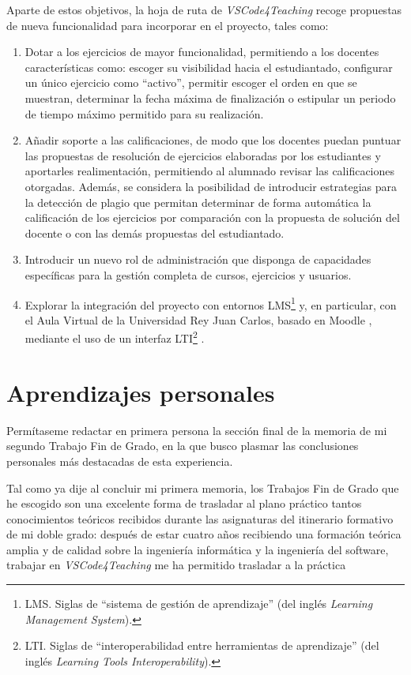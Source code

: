 Aparte de estos objetivos, la hoja de ruta de \textit{VSCode4Teaching} recoge propuestas de nueva funcionalidad para incorporar en el proyecto, tales como:
\begin{enumerate}
    \item Dotar a los ejercicios de mayor funcionalidad, permitiendo a los docentes características como: escoger su visibilidad hacia el estudiantado, configurar un único ejercicio como ``activo'', permitir escoger el orden en que se muestran, determinar la fecha máxima de finalización o estipular un periodo de tiempo máximo permitido para su realización.
    \item Añadir soporte a las calificaciones, de modo que los docentes puedan puntuar las propuestas de resolución de ejercicios elaboradas por los estudiantes y aportarles realimentación, permitiendo al alumnado revisar las calificaciones otorgadas. Además, se considera la posibilidad de introducir estrategias para la detección de plagio que permitan determinar de forma automática la calificación de los ejercicios por comparación con la propuesta de solución del docente o con las demás propuestas del estudiantado.
    \item Introducir un nuevo rol de administración que disponga de capacidades específicas para la gestión completa de cursos, ejercicios y usuarios.
    \item Explorar la integración del proyecto con entornos LMS\footnote{LMS. Siglas de ``sistema de gestión de aprendizaje'' (del inglés \textit{Learning Management System}).} y, en particular, con el Aula Virtual de la Universidad Rey Juan Carlos, basado en Moodle \cite{Moodle}, mediante el uso de un interfaz LTI\footnote{LTI. Siglas de ``interoperabilidad entre herramientas de aprendizaje'' (del inglés \textit{Learning Tools Interoperability}).} \cite{LTI_Spec}.
\end{enumerate}

\section{Aprendizajes personales}
\label{subsec:aprendizajesPersonales}
Permítaseme redactar en primera persona la sección final de la memoria de mi segundo Trabajo Fin de Grado, en la que busco plasmar las conclusiones personales más destacadas de esta experiencia.

Tal como ya dije al concluir mi primera memoria, los Trabajos Fin de Grado que he escogido son una excelente forma de trasladar al plano práctico tantos conocimientos teóricos recibidos durante las asignaturas del itinerario formativo de mi doble grado: después de estar cuatro años recibiendo una formación teórica amplia y de calidad sobre la ingeniería informática y la ingeniería del software, trabajar en \textit{VSCode4Teaching} me ha permitido trasladar a la práctica 

